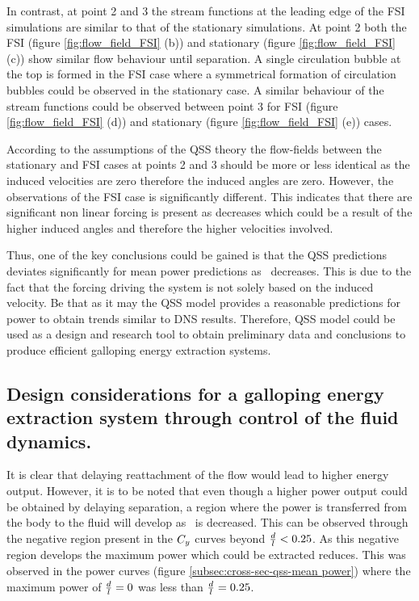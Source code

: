 In contrast, at point 2 and 3 the stream functions at the leading edge of the FSI simulations are similar to that of the stationary simulations. At point 2 both the FSI (figure \ref{fig:flow_field_FSI} (b)) and stationary (figure \ref{fig:flow_field_FSI} (c)) show similar flow behaviour until separation. A single circulation bubble at the top is formed in the FSI case where a symmetrical formation of circulation bubbles could be observed in the stationary case. A similar behaviour of the stream functions could be observed between point 3 for FSI (figure \ref{fig:flow_field_FSI} (d)) and stationary (figure \ref{fig:flow_field_FSI} (e)) cases. 

According to the assumptions of the QSS theory the flow-fields between the stationary and FSI cases at points 2 and 3 should be more or less identical as the induced velocities are zero therefore the induced angles are zero. However, the observations of the FSI case is significantly different. This indicates that there are significant non linear forcing is present as \ratio decreases which could be a result of the higher induced angles and therefore the higher velocities involved. 

Thus, one of the key conclusions could be gained is that the QSS predictions deviates significantly for mean power predictions as \ratio\ decreases. This is due to the fact that the forcing driving the system is not solely based on the induced velocity. Be that as it may the QSS model provides a reasonable predictions for power to obtain trends similar to DNS results. Therefore, QSS model could be used as a design and research tool to obtain preliminary data and conclusions to produce efficient galloping energy extraction systems. 

\subsection{Design considerations for a galloping energy extraction system through control of the fluid dynamics.}
\label{subsec:design-considerations-cross-section}
  
It is clear that delaying reattachment of the flow would lead to higher energy output. However, it is to be noted that even though a higher power output could be obtained by delaying separation, a region where the power is transferred from the body to the fluid will develop as \ratio\ is decreased. This can be observed through the negative region present in the $C_{y}$ curves beyond $\frac{d}{l}<0.25$. As this negative region develops the maximum power which could be extracted reduces. This was observed in the power curves (figure \ref{subsec:cross-sec-qss-mean power}) where the maximum power of $\frac{d}{l}=0$ was less than $\frac{d}{l}=0.25$.

